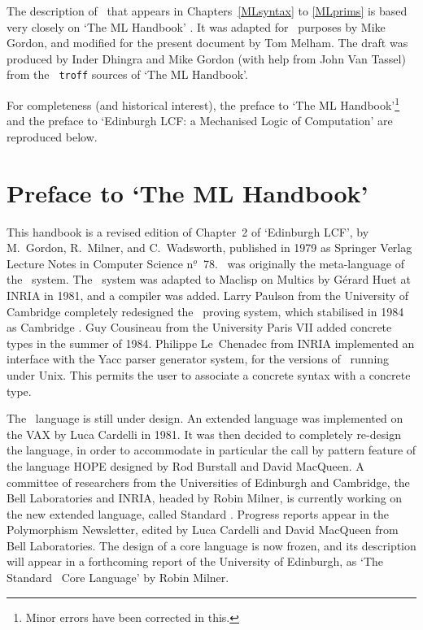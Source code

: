 The description of \ML\ that appears in 
Chapters~\ref{MLsyntax} to \ref{MLprims}
is based very closely on `The ML Handbook' \cite{ml-handbook}.
It was adapted for \HOL\ purposes by Mike Gordon,
and modified for the present document by Tom Melham.
The draft was produced by Inder Dhingra and Mike
Gordon (with help from John Van Tassel) from the {\tt
troff} 
sources of `The ML Handbook'. 

For completeness (and historical interest), 
the preface to `The ML Handbook'\footnote{Minor
errors have been corrected in this.} and the preface
to `Edinburgh LCF: a Mechanised Logic of Computation' are reproduced
below.

\vfill
\newpage
\section{Preface to `The ML Handbook'}

This handbook is a revised edition of Chapter~2 of `Edinburgh LCF',
by M.~Gordon, R.~Milner, and C.~Wadsworth, published in 1979 as
Springer Verlag Lecture Notes in Computer Science n$^{\underline{o}}$~78.
\ML\ was originally the meta-language of the \LCF~system. The \ML\ system was
adapted to Maclisp on Multics by G\'erard
Huet at {\small INRIA} in 1981, and a compiler was added.  Larry Paulson
from the University of Cambridge completely redesigned the \LCF\ proving
system, which stabilised in 1984 as Cambridge \LCF.  Guy Cousineau from
the University Paris VII added concrete types in the summer of 1984.  Philippe
Le~Chenadec from {\small INRIA} implemented an interface with the Yacc parser 
generator system, for the versions of \ML\ running under Unix.  This permits 
the user to associate a concrete syntax with a concrete type.

The \ML\ language is still under design.  An extended language was implemented
on the VAX by Luca Cardelli in 1981.  It was then decided to completely
re-design the language, in order to accommodate in particular the call by
pattern feature of the language HOPE designed by Rod Burstall and David
MacQueen.  A committee of researchers from the Universities of Edinburgh and
Cambridge, the Bell Laboratories and {\small INRIA}, headed by Robin Milner, is
currently working on the new extended language, called Standard \ML.  Progress
reports appear in the Polymorphism Newsletter, edited by Luca Cardelli and
David MacQueen from Bell Laboratories.  The design of a core language is now
frozen, and its description will appear in a forthcoming report of
the University of Edinburgh, as `The Standard \ML\ Core Language' by Robin Milner.

